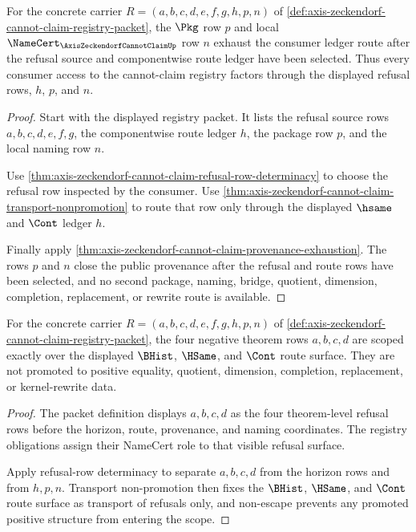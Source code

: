 \begin{theorem}
\label{thm:axis-zeckendorf-ledger-route-scope}
For the concrete carrier $R=(a,b,c,d,e,f,g,h,p,n)$ of \autoref{def:axis-zeckendorf-cannot-claim-registry-packet}, the $\Pkg$ row $p$ and local $\NameCert_{\AxisZeckendorfCannotClaimUp}$ row $n$ exhaust the consumer ledger route after the refusal source and componentwise route ledger have been selected. Thus every consumer access to the cannot-claim registry factors through the displayed refusal rows, $h$, $p$, and $n$.
\end{theorem}
\begin{proof}
Start with the displayed registry packet. It lists the refusal source rows $a,b,c,d,e,f,g$, the componentwise route ledger $h$, the package row $p$, and the local naming row $n$.

Use \autoref{thm:axis-zeckendorf-cannot-claim-refusal-row-determinacy} to choose the refusal row inspected by the consumer. Use \autoref{thm:axis-zeckendorf-cannot-claim-transport-nonpromotion} to route that row only through the displayed $\hsame$ and $\Cont$ ledger $h$.

Finally apply \autoref{thm:axis-zeckendorf-cannot-claim-provenance-exhaustion}. The rows $p$ and $n$ close the public provenance after the refusal and route rows have been selected, and no second package, naming, bridge, quotient, dimension, completion, replacement, or rewrite route is available.
\end{proof}

\begin{theorem}
\label{thm:axis-zeckendorf-cannot-claim-negative-row-scope}
For the concrete carrier $R=(a,b,c,d,e,f,g,h,p,n)$ of \autoref{def:axis-zeckendorf-cannot-claim-registry-packet}, the four negative theorem rows $a,b,c,d$ are scoped exactly over the displayed $\BHist$, $\HSame$, and $\Cont$ route surface. They are not promoted to positive equality, quotient, dimension, completion, replacement, or kernel-rewrite data.
\end{theorem}
\begin{proof}
The packet definition displays $a,b,c,d$ as the four theorem-level refusal rows before the horizon, route, provenance, and naming coordinates. The registry obligations assign their NameCert role to that visible refusal surface.

Apply refusal-row determinacy to separate $a,b,c,d$ from the horizon rows and from $h,p,n$. Transport non-promotion then fixes the $\BHist$, $\HSame$, and $\Cont$ route surface as transport of refusals only, and non-escape prevents any promoted positive structure from entering the scope.
\end{proof}

